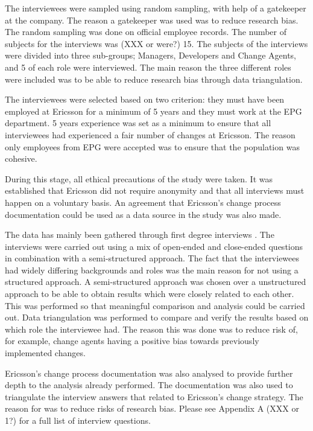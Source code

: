 \documentclass[10pt,twocolumn]{article}
\begin{document}
The interviewees were sampled using random sampling, with help of a gatekeeper at the company. The reason a gatekeeper was used was to reduce research bias. The random sampling was done on official employee records. The number of subjects for the interviews was (XXX or were?) 15. The subjects of the interviews were divided into three sub-groups; Managers, Developers and Change Agents, and 5 of each role were interviewed. The main reason the three different roles were included was to be able to reduce research bias through data triangulation.

The interviewees were selected based on two criterion: they must have been employed at Ericsson for a minimum of 5 years and they must work at the EPG department. 5 years experience was set as a minimum to ensure that all interviewees had experienced a fair number of changes at Ericsson. The reason only employees from EPG were accepted was to ensure that the population was cohesive. 

During this stage, all ethical precautions of the study were taken. It was established that Ericsson did not require anonymity and that all interviews must happen on a voluntary basis. An agreement that Ericsson's change process documentation could be used as a data source in the study was also made. 

The data has mainly been gathered through first degree interviews \cite{lethbridge2005studying}. The interviews were carried out using a mix of open-ended and close-ended questions in combination with a semi-structured approach. The fact that the interviewees had widely differing backgrounds and roles was the main reason for not using a structured approach. A semi-structured approach was chosen over a unstructured approach to be able to obtain results which were closely related to each other. This was performed so that meaningful comparison and analysis could be carried out. Data triangulation was performed to compare and verify the results based on which role the interviewee had. The reason this was done was to reduce risk of, for example, change agents having a positive bias towards previously implemented changes. 

Ericsson's change process documentation was also analysed to provide further depth to the analysis already performed. The documentation was also used to triangulate the interview answers that related to Ericsson's change strategy. The reason for was to reduce risks of research bias. Please see Appendix A (XXX or 1?) for a full list of interview questions.
\end{document}
